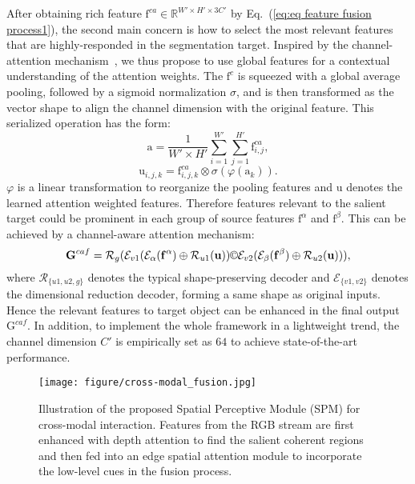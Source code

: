 \documentclass[journal]{IEEEtran}
\newcommand{\equref}[1]{(\ref{#1})}
\newcommand{\mc}[1]{\mathcal{#1}}
\newcommand{\br}[1]{\bm{\mathrm{#1}}}
\begin{document}
After obtaining rich feature $\br{f}^{ca}\in \mathbb{R}^{W'\times H'\times 3C'}$ by Eq.~\equref{eq:eq feature fusion process1}, the second main concern is how to select the most relevant features that are highly-responded in the segmentation target. Inspired by the channel-attention mechanism~\cite{hu2018squeeze,chen2017sca}, we thus propose to use global features for a contextual understanding of the attention weights. The $\br{f}^{c}$ is squeezed with a global average pooling, followed by a sigmoid normalization $\sigma$, and is then transformed as the vector shape to align the channel dimension with the original feature.
This serialized operation has the form:
\begin{equation}\label{eq:eq feature fusion process2}
\br{a}=\frac{1}{W'\times H'} \sum_{i=1}^{W'}\sum_{j=1}^{H'}\br{f}^{ca}_{i,j},
\end{equation}
\begin{equation} \label{eq:eq feature fusion process3}
\br{u}_{i,j,k} = \br{f}^{ca}_{i,j,k} \otimes \sigma(\varphi(\br{a}_{k})).
\end{equation}
$\varphi$ is a linear transformation to reorganize the pooling features and $\br{u}$ denotes the learned attention weighted features. Therefore features relevant to the salient target could be prominent in each group of source features $\br{f}^\alpha$ and $\br{f}^\beta$. This can be achieved by a channel-aware attention mechanism:
\begin{equation} \label{eq:eq feature fusion process3}
\br{G}^{caf} = \mc{R}_g (\mc{E}_{v1}(\mc{E}_{\alpha}(\br{f}^\alpha) \oplus \mc{R}_{u1}(\br{u}))
\copyright
\mc{E}_{v2}(\mc{E}_{\beta}(\br{f}^\beta) \oplus \mc{R}_{u2}(\br{u}))),
\end{equation}
where $\mc{R}_{\{u1,u2,g\}}$ denotes the typical shape-preserving decoder and $\mc{E}_{\{v1,v2\}}$ denotes the dimensional reduction decoder, forming a same shape as original inputs. Hence the relevant features to target object can be enhanced in the final output $\br{G}^{caf}$.
In addition, to implement the whole framework in a lightweight trend, the channel dimension $C'$ is empirically set as $64$ to achieve state-of-the-art performance.

\begin{figure}[]
\begin{center}
\texttt{[image: figure/cross-modal\_fusion.jpg]}
		\caption{Illustration of the proposed Spatial Perceptive Module (SPM) for cross-modal interaction. Features from the RGB stream are first enhanced with depth attention to find the salient coherent regions and then fed into an edge spatial attention module to incorporate the low-level cues in the fusion process.
		}\label{fig:SPM}
	\end{center}
\end{figure}
\end{document}
